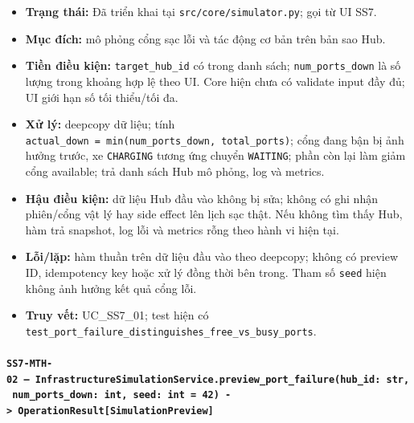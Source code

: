 \documentclass[11pt,a4paper]{article}
\providecommand{\tightlist}{%
  \setlength{\itemsep}{0pt}\setlength{\parskip}{0pt}}
\begin{document}
\begin{itemize}
\tightlist
\item
  \textbf{Trạng thái:} Đã triển khai tại \texttt{src/core/simulator.py};
  gọi từ UI SS7.
\item
  \textbf{Mục đích:} mô phỏng cổng sạc lỗi và tác động cơ bản trên bản
  sao Hub.
\item
  \textbf{Tiền điều kiện:} \texttt{target\_hub\_id} có trong danh sách;
  \texttt{num\_ports\_down} là số lượng trong khoảng hợp lệ theo UI.
  Core hiện chưa có validate input đầy đủ; UI giới hạn số tối thiểu/tối
  đa.
\item
  \textbf{Xử lý:} deepcopy dữ liệu; tính
  \texttt{actual\_down\ =\ min(num\_ports\_down,\ total\_ports)}; cổng
  đang bận bị ảnh hưởng trước, xe \texttt{CHARGING} tương ứng chuyển
  \texttt{WAITING}; phần còn lại làm giảm cổng available; trả danh sách
  Hub mô phỏng, log và metrics.
\item
  \textbf{Hậu điều kiện:} dữ liệu Hub đầu vào không bị sửa; không có ghi
  nhận phiên/cổng vật lý hay side effect lên lịch sạc thật. Nếu không
  tìm thấy Hub, hàm trả snapshot, log lỗi và metrics rỗng theo hành vi
  hiện tại.
\item
  \textbf{Lỗi/lặp:} hàm thuần trên dữ liệu đầu vào theo deepcopy; không
  có preview ID, idempotency key hoặc xử lý đồng thời bên trong. Tham số
  \texttt{seed} hiện không ảnh hưởng kết quả cổng lỗi.
\item
  \textbf{Truy vết:} UC\_SS7\_01; test hiện có
  \texttt{test\_port\_failure\_distinguishes\_free\_vs\_busy\_ports}.
\end{itemize}

\hypertarget{ss7-mth-02-infrastructuresimulationservice.preview_port_failurehub_id-str-num_ports_down-int-seed-int-42---operationresultsimulationpreview}{%
\paragraph{\texorpdfstring{\texttt{SS7-MTH-02\ —\ InfrastructureSimulationService.preview\_port\_failure(hub\_id:\ str,\ num\_ports\_down:\ int,\ seed:\ int\ =\ 42)\ -\textgreater{}\ OperationResult{[}SimulationPreview{]}}}{SS7-MTH-02 --- InfrastructureSimulationService.preview\_port\_failure(hub\_id: str, num\_ports\_down: int, seed: int = 42) -\textgreater{} OperationResult{[}SimulationPreview{]}}}\label{ss7-mth-02-infrastructuresimulationservice.preview_port_failurehub_id-str-num_ports_down-int-seed-int-42---operationresultsimulationpreview}}
\end{document}
